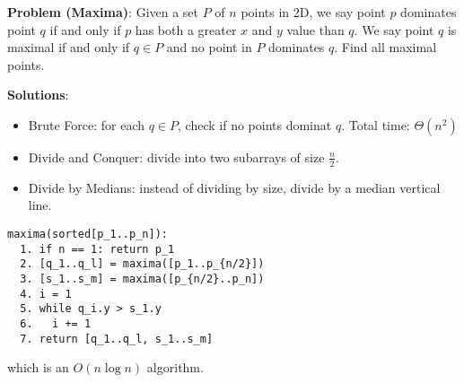 \documentclass[12pt]{article}
\begin{document}
{\bf Problem (Maxima)}: Given a set $P$ of $n$ points in 2D, we say point $p$ dominates point $q$ if and only if $p$ has both a greater $x$ and $y$ value than $q$. We say point $q$ is maximal if and only if $q \in P$ and no point in $P$ dominates $q$. Find all maximal points.

{\bf Solutions}:
\begin{itemize}
\item Brute Force: for each $q \in P$, check if no points dominat $q$. Total time: $\Theta(n^2)$
\item Divide and Conquer: divide into two subarrays of size $\frac{n}{2}$.
\item Divide by Medians: instead of dividing by size, divide by a median vertical line.
\end{itemize}

\begin{verbatim}
maxima(sorted[p_1..p_n]):
  1. if n == 1: return p_1
  2. [q_1..q_l] = maxima([p_1..p_{n/2}])
  3. [s_1..s_m] = maxima([p_{n/2}..p_n])
  4. i = 1
  5. while q_i.y > s_1.y
  6.   i += 1
  7. return [q_1..q_l, s_1..s_m]
\end{verbatim}
which is an $O(n\log n)$ algorithm.
\end{document}
